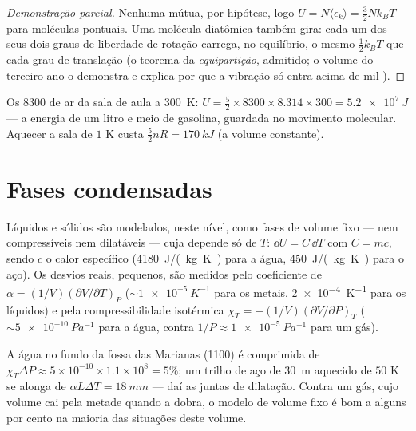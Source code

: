 \begin{proof}[Demonstração parcial]
Nenhuma  mútua, por hipótese, logo $U = N\langle\epsilon_k\rangle
= \tfrac32 Nk_BT$ para moléculas pontuais. Uma molécula diatômica também
gira: cada um dos seus dois graus de liberdade de rotação carrega, no
equilíbrio, o mesmo $\tfrac12 k_BT$ que cada grau de translação (o teorema da
\emph{equipartição}, admitido; o volume do terceiro ano o demonstra e explica
por que a vibração só entra acima de mil ).
\end{proof}

\begin{example}\label{ex:b1:kinetic-theory:room}
Os \qty{8300}{} de ar da sala de aula a \qty{300}{K}: $U = \tfrac52 \times
8300 \times 8.314 \times 300 = \qty{5.2e7}{J}$ --- a energia de um litro e
meio de gasolina, guardada no movimento molecular. Aquecer a sala de $1$ K
custa $\tfrac52 nR = \qty{170}{kJ}$ (a volume constante).
\end{example}

\section{Fases condensadas}

\begin{proposition}\label{prop:b1:kinetic-theory:condensed}
Líquidos e sólidos são modelados, neste nível, como fases de volume fixo
--- nem compressíveis nem dilatáveis --- cuja  depende só de
$T$: $\dd U = C\,\dd T$ com $C = mc$, sendo $c$ o calor
específico (\qty{4180}{J/(kg.K)} para a água, \qty{450}{J/(kg.K)} para o
aço). Os desvios reais, pequenos, são medidos pelo coeficiente de  $\alpha = (1/V)(\partial V/\partial T)_P$ ($\sim\qty{1e-5}{K^{-1}}$
para os metais, \qty{2e-4}{K^{-1}} para os líquidos) e pela
compressibilidade isotérmica $\chi_T = -(1/V)(\partial V/\partial P)_T$ ($\sim\qty{5e-10}{Pa^{-1}}$
para a água, contra $1/P \approx \qty{1e-5}{Pa^{-1}}$ para um gás).
\end{proposition}
\admitted

\begin{example}\label{ex:b1:kinetic-theory:water}
A água no fundo da fossa das Marianas (\qty{1100}{}) é comprimida de
$\chi_T\Delta P \approx 5\times10^{-10} \times 1.1\times10^8 = 5\%$; um trilho
de aço de \qty{30}{m} aquecido de $50$ K se alonga de $\alpha L\Delta T =
\qty{18}{mm}$ --- daí as juntas de dilatação. Contra um gás, cujo
volume cai pela metade quando a  dobra, o modelo de volume fixo é
bom a alguns por cento na maioria das situações deste volume.
\end{example}

